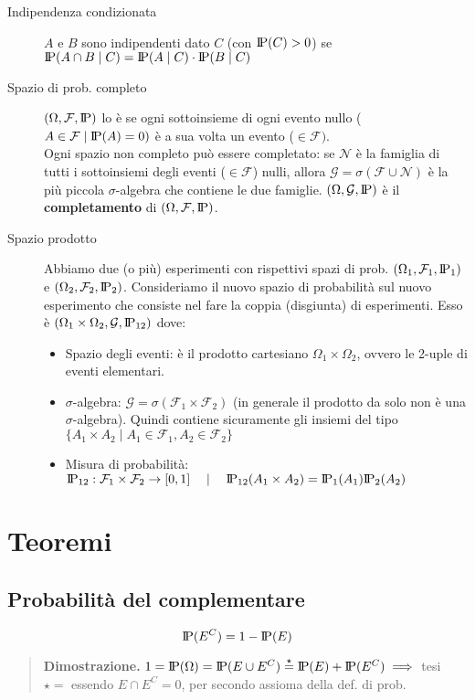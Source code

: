 \documentclass[a4paper,10pt]{article}
\newcommand{\pr}{\text{I\kern-0.15em P}} %
\newcommand{\om}{\Omega} %
\theoremstyle{remark}
\theoremstyle{definition}
\newenvironment{dimo}{\begin{quote}\textbf{Dimostrazione.}}{\end{quote}} %
\begin{document}
\begin{description}
    \item[Indipendenza condizionata] $A$ e $B$ sono indipendenti dato $C$ (con $\pr(C)>0$) se \\
    $\pr(A\cap B \mid C)=\pr(A\mid C)\cdot \pr(B \mid C)$

    \item[Spazio di prob. completo] $(\om, \mathcal{F}, \pr)$ lo è se ogni sottoinsieme di ogni evento nullo ($A\in \mathcal{F} \mid \pr(A)=0)$ è a sua volta un evento ($\in \mathcal{F})$. \\
    Ogni spazio non completo può essere completato: se $\mathcal{N}$ è la famiglia di tutti  i sottoinsiemi degli eventi ($\in \mathcal{F}$) nulli, allora $\mathcal{G}=\sigma(\mathcal{F}\cup\mathcal{N})$ è la più piccola $\sigma$-algebra che contiene le due famiglie. $(\om, \mathcal{G}, \pr)$ è il \textbf{completamento} di $(\om, \mathcal{F}, \pr)$.

    \item[Spazio prodotto] Abbiamo due (o più) esperimenti con rispettivi spazi di prob. $(\om_1, \mathcal{F}_1, \pr_1)$ e $(\om_2, \mathcal{F}_2, \pr_2)$. Consideriamo il nuovo spazio di probabilità sul nuovo esperimento che consiste nel fare la coppia (disgiunta) di esperimenti. Esso è $(\om_1 \times \om_2, \mathcal{G}, \pr_{12})$ dove:
    \begin{itemize}
        \item Spazio degli eventi: è il prodotto cartesiano $\om_1 \times \om_2$, ovvero le 2-uple di eventi elementari.
        \item $\sigma$-algebra: $\mathcal{G}=\sigma(\mathcal{F}_1 \times \mathcal{F}_2)$ (in generale il prodotto da solo non è una $\sigma$-algebra). Quindi contiene sicuramente gli insiemi del tipo $\{A_1 \times A_2 \mid A_1 \in \mathcal{F}_1, A_2\in\mathcal{F}_2\}$
        \item Misura di probabilità: $\pr_{12}: \mathcal{F}_1 \times \mathcal{F}_2 \to [0,1] \quad \mid \quad \pr_{12}(A_1 \times A_2)=\pr_1(A_1)\pr_2(A_2)$
    \end{itemize}
\end{description}



\section*{Teoremi}
\subsection{Probabilità del complementare}
$$\pr (E^C)=1-\pr(E)$$
\begin{dimo}
    $1=\pr(\Omega)=\pr(E\cup E^C)\overset{\star}{=}\pr(E)+\pr(E^C) \implies$ tesi \\
    $\star=$ essendo $E\cap E^C=0$, per secondo assioma della def. di prob.
\end{dimo}
\end{document}
